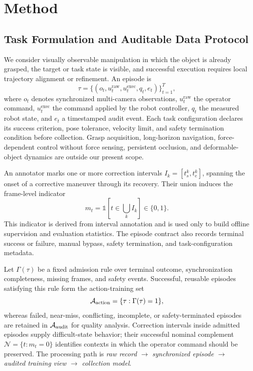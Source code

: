 \section{Method}
\label{sec:method}

\subsection{Task Formulation and Auditable Data Protocol}
We consider visually observable manipulation in which the object is already
grasped, the target or task state is visible, and successful execution requires
local trajectory alignment or refinement. An episode is
\begin{equation}
  \tau=\{(o_t,u^{\mathrm{raw}}_t,u^{\mathrm{exec}}_t,q_t,e_t)\}_{t=1}^{T},
  \label{eq:episode}
\end{equation}
where $o_t$ denotes synchronized multi-camera observations,
$u^{\mathrm{raw}}_t$ the operator command, $u^{\mathrm{exec}}_t$ the command
applied by the robot controller, $q_t$ the measured robot state, and $e_t$ a
timestamped audit event. Each task configuration declares its success
criterion, pose tolerance, velocity limit, and safety termination condition
before collection. Grasp acquisition, long-horizon navigation, force-dependent
control without force sensing, persistent occlusion, and deformable-object
dynamics are outside our present scope.

An annotator marks one or more correction intervals
$I_k=[t_s^k,t_e^k]$, spanning the onset of a corrective maneuver through its
recovery. Their union induces the frame-level indicator
\begin{equation}
  m_t=\mathbb{1}\!\left[t\in\bigcup_k I_k\right]\in\{0,1\}.
  \label{eq:correction_indicator}
\end{equation}
This indicator is derived from interval annotation and is used only to build
offline supervision and evaluation statistics. The episode contract also
records terminal success or failure, manual bypass, safety termination, and
task-configuration metadata.

Let $\Gamma(\tau)$ be a fixed admission rule over terminal outcome,
synchronization completeness, missing frames, and safety events. Successful,
reusable episodes satisfying this rule form the action-training set
\begin{equation}
  \mathcal{A}_{\mathrm{action}}=\{\tau:\Gamma(\tau)=1\},
\end{equation}
whereas failed, near-miss, conflicting, incomplete, or safety-terminated
episodes are retained in $\mathcal{A}_{\mathrm{audit}}$ for quality analysis. Correction intervals
inside admitted episodes supply difficult-state behavior; their successful
nominal complement $\mathcal{N}=\{t:m_t=0\}$ identifies contexts in which the
operator command should be preserved. The processing path is
\emph{raw record $\rightarrow$ synchronized episode $\rightarrow$ audited
training view $\rightarrow$ collection model}.

